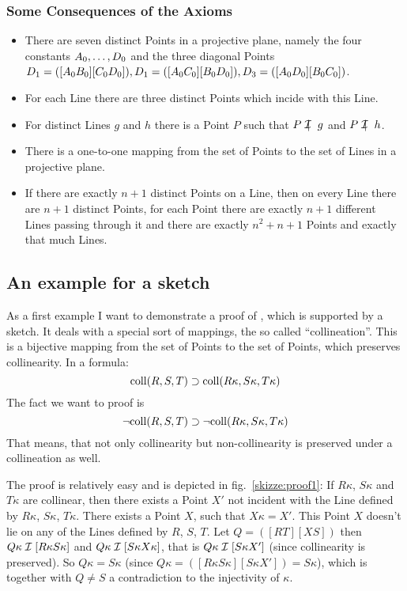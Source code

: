 \subsubsection{Some Consequences of the Axioms%
\label{:projective:consequences}}

\begin{itemize}
\item There are seven distinct Points in a projective plane, namely
        the four constants $A_0,\dots,D_0$ and the three diagonal
        Points\\ $D_1=([A_0B_0][C_0D_0]), D_1=([A_0C_0][B_0D_0]),
        D_3=([A_0D_0][B_0C_0])$.
\item For each Line there are three distinct Points which incide with
        this Line.
\item For distinct Lines $g$ and $h$ there is a Point $P$ such
        that $P\notcI g$ and $P\notcI h$.
\item There is a one-to-one mapping from the set of Points to the set
        of Lines in a projective plane.
\item If there are exactly $n+1$ distinct Points on a Line, then on
        every Line there are $n+1$ distinct Points, for each Point there
        are exactly $n+1$ different Lines passing through it and there
        are exactly $n^2+n+1$ Points and exactly that much Lines.
\end{itemize}


\subsection{An example for a sketch}

As a first example I want to demonstrate a proof of \pg, which is
supported by a sketch. It deals with a special sort of mappings, the
so called ``collineation''. This is a bijective mapping from the set
of Points to the set of Points, which preserves collinearity. In a
formula:
$$\mathrm{coll}(R,S,T)\supset\mathrm{coll}(R\kappa,S\kappa,T\kappa)$$
The fact we want to proof is
$$\lnot\mathrm{coll}(R,S,T)\supset\lnot\mathrm{coll}(R\kappa, S\kappa, T\kappa)$$
That means, that not only collinearity but non-collinearity is preserved
under a collineation as well.

The proof is relatively easy and is depicted in
fig.~\ref{skizze:proof1}: If $R\kappa$, $S\kappa$ and $T\kappa$ are
collinear, then there exists a Point $X'$ not incident with the Line
defined by $R\kappa$, $S\kappa$, $T\kappa$. There exists a Point $X$,
such that $X\kappa = X'$. This Point $X$ doesn't lie on any of the
Lines defined by $R$, $S$, $T$. Let $Q=([RT][XS])$ then $Q\kappa\cI
[R\kappa S\kappa]$ and $Q\kappa\cI [S\kappa X\kappa]$, that is
$Q\kappa\cI [S\kappa X']$ (since collinearity is preserved). So
$Q\kappa = S\kappa$ (since $Q\kappa = ([R\kappa S\kappa][S\kappa X']) =
S\kappa$), which is together with $Q\not=S$ a contradiction to the
injectivity of $\kappa$.

